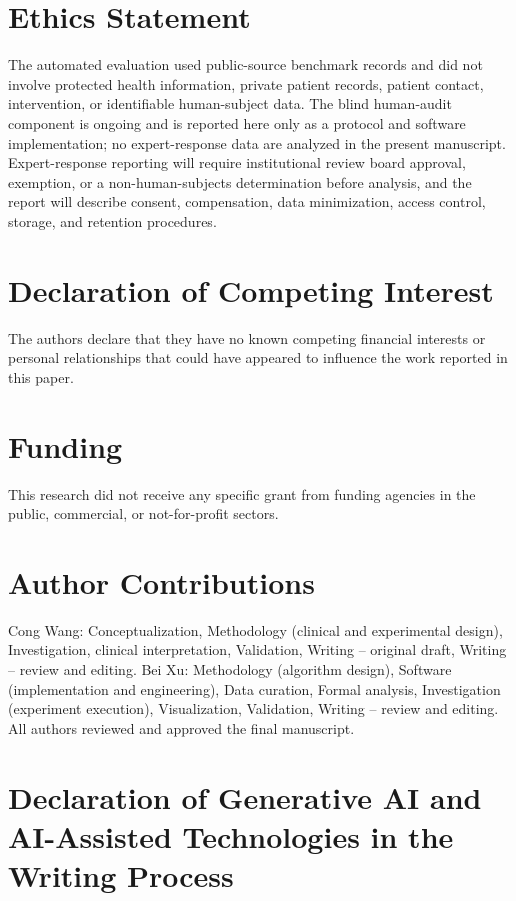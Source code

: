 \documentclass[11pt,a4paper]{article}
\begin{document}
\section*{Ethics Statement}

The automated evaluation used public-source benchmark records and did not involve protected health information, private patient records, patient contact, intervention, or identifiable human-subject data. The blind human-audit component is ongoing and is reported here only as a protocol and software implementation; no expert-response data are analyzed in the present manuscript. Expert-response reporting will require institutional review board approval, exemption, or a non-human-subjects determination before analysis, and the report will describe consent, compensation, data minimization, access control, storage, and retention procedures.

\section*{Declaration of Competing Interest}

The authors declare that they have no known competing financial interests or personal relationships that could have appeared to influence the work reported in this paper.

\section*{Funding}

This research did not receive any specific grant from funding agencies in the public, commercial, or not-for-profit sectors.

\section*{Author Contributions}

Cong Wang: Conceptualization, Methodology (clinical and experimental design), Investigation, clinical interpretation, Validation, Writing -- original draft, Writing -- review and editing. Bei Xu: Methodology (algorithm design), Software (implementation and engineering), Data curation, Formal analysis, Investigation (experiment execution), Visualization, Validation, Writing -- review and editing. All authors reviewed and approved the final manuscript.

\section*{Declaration of Generative AI and AI-Assisted Technologies in the Writing Process}
\end{document}

